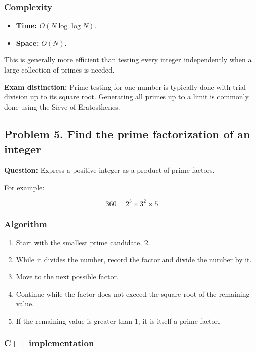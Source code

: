 \subsubsection{Complexity}

\begin{itemize}
    \item \textbf{Time:} $O(N\log\log N)$.
    \item \textbf{Space:} $O(N)$.
\end{itemize}

This is generally more efficient than testing every integer independently when a large collection of primes is needed.

\textbf{Exam distinction:} Prime testing for one number is typically done with trial division up to its square root. Generating all primes up to a limit is commonly done using the Sieve of Eratosthenes.

\subsection{Problem 5. Find the prime factorization of an integer}

\textbf{Question:} Express a positive integer as a product of prime factors.

For example:


\[
360=2^3\times3^2\times5
\]


\subsubsection{Algorithm}

\begin{enumerate}
    \item Start with the smallest prime candidate, 2.
    \item While it divides the number, record the factor and divide the number by it.
    \item Move to the next possible factor.
    \item Continue while the factor does not exceed the square root of the remaining value.
    \item If the remaining value is greater than 1, it is itself a prime factor.
\end{enumerate}

\subsubsection{C++ implementation}

